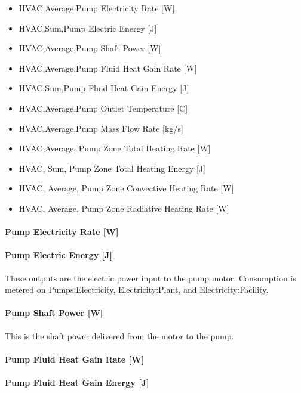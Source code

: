 \begin{itemize}
\item
  HVAC,Average,Pump Electricity Rate {[}W{]}
\item
  HVAC,Sum,Pump Electric Energy {[}J{]}
\item
  HVAC,Average,Pump Shaft Power {[}W{]}
\item
  HVAC,Average,Pump Fluid Heat Gain Rate {[}W{]}
\item
  HVAC,Sum,Pump Fluid Heat Gain Energy {[}J{]}
\item
  HVAC,Average,Pump Outlet Temperature {[}C{]}
\item
  HVAC,Average,Pump Mass Flow Rate {[}kg/s{]}
\item
  HVAC,Average, Pump Zone Total Heating Rate {[}W{]}
\item
  HVAC, Sum, Pump Zone Total Heating Energy {[}J{]}
\item
  HVAC, Average, Pump Zone Convective Heating Rate {[}W{]}
\item
  HVAC, Average, Pump Zone Radiative Heating Rate {[}W{]}
\end{itemize}

\paragraph{Pump Electricity Rate {[}W{]}}\label{pump-electric-power-w-2}

\paragraph{Pump Electric Energy {[}J{]}}\label{pump-electric-energy-j-2}

These outputs are the electric power input to the pump motor. Consumption is metered on Pumps:Electricity, Electricity:Plant, and Electricity:Facility.

\paragraph{Pump Shaft Power {[}W{]}}\label{pump-shaft-power-w-2}

This is the shaft power delivered from the motor to the pump.

\paragraph{Pump Fluid Heat Gain Rate {[}W{]}}\label{pump-fluid-heat-gain-rate-w-2}

\paragraph{Pump Fluid Heat Gain Energy {[}J{]}}\label{pump-fluid-heat-gain-energy-j-2}

